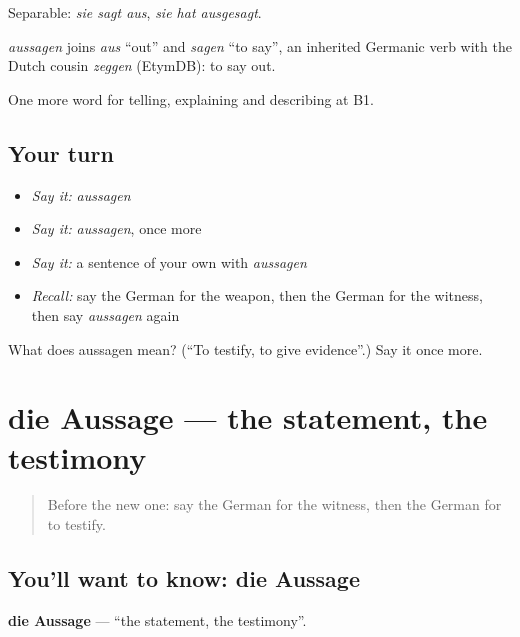Separable: \emph{sie sagt aus}, \emph{sie hat ausgesagt}.

\begin{cousinweb}
\emph{aussagen} joins \emph{aus} \textquotedblleft{}out\textquotedblright{} and \emph{sagen} \textquotedblleft{}to say\textquotedblright{}, an inherited Germanic verb with the Dutch cousin \emph{zeggen} (EtymDB): to say out.
\end{cousinweb}

\begin{grammarlens}[title={What you've built}]
One more word for telling, explaining and describing at B1.
\end{grammarlens}

\subsection*{Your turn}
\begin{itemize}
\raggedright
  \item \emph{Say it:} \emph{aussagen}
  \item \emph{Say it:} \emph{aussagen}, once more
  \item \emph{Say it:} a sentence of your own with \emph{aussagen}
  \item \emph{Recall:} say the German for the weapon, then the German for the witness, then say \emph{aussagen} again
\end{itemize}

\begin{tcolorbox}[breakable,colback=teal!4,colframe=teal!35!black,title={Before you move on}]
What does aussagen mean? (\textquotedblleft{}To testify, to give evidence\textquotedblright{}.) Say it once more.
\end{tcolorbox}
\section[die Aussage]{die Aussage — the statement, the testimony}

\label{lesson:GE-C283-aussage}



\begin{quote}
Before the new one: say the German for the witness, then the German for to testify.
\end{quote}

\subsection*{You'll want to know: die Aussage}
\textbf{die Aussage} — \textquotedblleft{}the statement, the testimony\textquotedblright{}.

